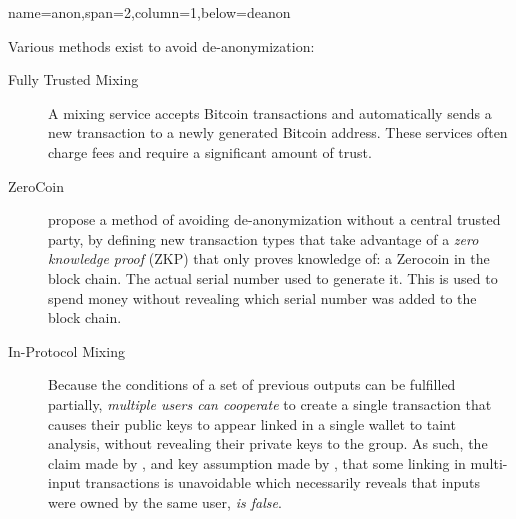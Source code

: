 \documentclass[a0paper,portrait]{baposter}
\begin{document}
\begin{poster}
{name=anon,span=2,column=1,below=deanon}{
\begin{multicols}{2}
Various methods exist to avoid de-anonymization:
\begin{description}
\item[Fully Trusted Mixing]
A mixing service accepts Bitcoin transactions and automatically sends a new transaction to a newly generated Bitcoin address.  These services often charge fees and require a significant amount of trust.
\item[ZeroCoin]
\textcite{zerocoin} propose a method of avoiding de-anonymization without a central trusted party, by defining new transaction types that take advantage of a \emph{zero knowledge proof} (ZKP) that only proves knowledge of: a Zerocoin in the block chain. The actual serial number used to generate it. This is used to spend money without revealing which serial number was added to the block chain.
\item[In-Protocol Mixing]
Because the conditions of a set of previous outputs can be fulfilled partially, \emph{multiple users can cooperate} to create a single transaction that causes their public keys to appear linked in a single wallet to taint analysis, without revealing their private keys to the group.  As such, the claim made by \textcite{satoshi}, and key assumption made by \textcite{reid-anon}, that some linking in multi-input transactions is unavoidable which necessarily reveals that inputs were owned by the same user, \emph{is false}.

\end{description}
\end{multicols}
}


\end{poster}
\end{document}
